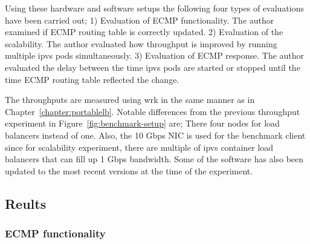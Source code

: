 Using these hardware and software setups the following four types of evaluations have been carried out;
1) Evaluation of ECMP functionality. The author examined if ECMP routing table is correctly updated.
2) Evaluation of the scalability. The author evaluated how throughput is improved by running multiple ipvs pods simultaneously.
3) Evaluation of ECMP response. The author evaluated the delay between the time ipvs pods are started or stopped until the time ECMP routing table reflected the change.


The throughputs are measured using wrk in the same manner as in Chapter~\ref{chapter:portablelb}.
Notable differences from the previous throughput experiment in Figure~\ref{fig:benchmark-setup} are;
There four nodes for load balancers instead of one.
Also, the 10 Gbps NIC is used for the benchmark client since for scalability experiment, there are multiple of ipvs container load balancers that can fill up 1 Gbps bandwidth.
Some of the software has also been updated to the most recent versions at the time of the experiment.

\FloatBarrier

\subsection{Reults}

\subsubsection{ECMP functionality}


